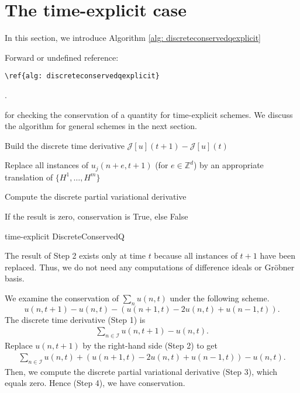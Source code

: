 \documentclass[runningheads]{llncs}
\newcommand{\1}{\chi}
\begin{document}
\newpage
\section{The time-explicit case}
\label{time-exp}
In this section, we introduce Algorithm \ref{alg: discreteconservedqexplicit}
 {\color{red} Forward or undefined reference: \begin{verbatim}\ref{alg: discreteconservedqexplicit}\end{verbatim}.}
  for checking the conservation of a quantity for time-explicit schemes. We discuss the algorithm for general schemes in the next section.
\begin{algorithm}
	\DontPrintSemicolon
	
	\label{estep1} Build the discrete time derivative \(\mathcal{J}[u](t+1)-\mathcal{J}[u](t)\)\;
	
	\label{estep2} Replace all instances of \(u_j(n+e,t+1)\) (for \(e\in{\mathbb{Z}}^{d}\)) by an appropriate translation of \(\{H^1,\ldots,H^m\}\)\;
	
	\label{estep3} Compute the discrete partial variational derivative\;
	
	\label{estep4} If the result is zero, conservation is {\sc True}, else {\sc False}\;
	
	\caption{{\sc time-explicit DiscreteConservedQ}}
	\label{alg: discreteconservedqexplicit}
\end{algorithm}
The result of Step 2 exists only at time \(t\) because all instances of \(t+1\) have been replaced. Thus, we do not need any computations of difference ideals or Gr{\"o}bner basis.
\begin{example}
	\label{timeexplicitheateqalgo}
	We examine the conservation of \(\sum_nu(n,t)\) under the following scheme.
	\begin{equation*}
		u(n,t+1)-u(n,t)-(u(n+1,t)-2u(n,t)+u(n-1,t)).
	\end{equation*}
	The discrete time derivative (Step 1) is
	\begin{gather*}
		\sum_{n\in\mathcal{I}}u(n,t+1)-u(n,t).
	\end{gather*}
	Replace \(u(n,t+1)\) by the right-hand side (Step 2) to get
	\begin{gather*}
		\sum_{n\in\mathcal{I}}u(n,t)+(u(n+1,t)-2u(n,t)+u(n-1,t))-u(n,t).
	\end{gather*}
	Then, we compute the discrete partial variational derivative (Step 3), which equals zero. Hence (Step 4), we have conservation.
\end{example}
\end{document}

